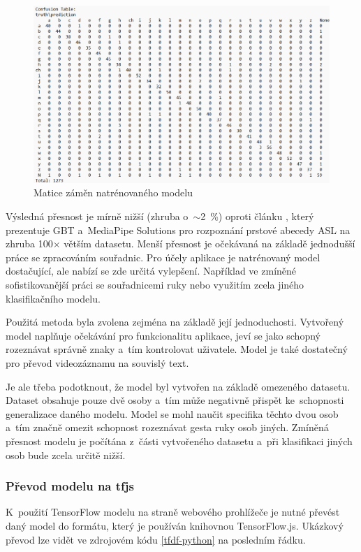 \documentclass[
  master,
  program=ainfvs,
  biblatex,
  figures=true,
  tables=false,
  sourcecodes=true,
  glossaries,
  index
]{kidiplom}
\begin{document}
             \begin{figure}[htbp]
                \centering
                \includegraphics[width=0.9\columnwidth]{graphics/confusion-matrix.png}
                \caption{Matice záměn natrénovaného modelu}
                \label{confusion-matrix}
            \end{figure}
            
            Výsledná přesnost je mírně nižší (zhruba o~\(\sim \)2~\%) oproti článku \cite{benchmark-article}, který prezentuje GBT a~MediaPipe Solutions pro rozpoznání prstové abecedy ASL na zhruba 100\(\times\) větším datasetu. Menší přesnost je očekávaná na základě jednodušší práce se zpracováním souřadnic. Pro účely aplikace je natrénovaný model dostačující, ale nabízí se zde určitá vylepšení. Například ve zmíněné sofistikovanější práci se souřadnicemi ruky nebo využitím zcela jiného klasifikačního modelu. 
            
            Použitá metoda byla zvolena zejména na základě její jednoduchosti. Vytvořený model naplňuje očekávání pro funkcionalitu aplikace, jeví se jako schopný rozeznávat správně znaky a~tím kontrolovat uživatele. Model je také dostatečný pro převod videozáznamu na souvislý text.

            Je ale třeba podotknout, že model byl vytvořen na základě omezeného datasetu. Dataset obsahuje pouze dvě osoby a~tím může negativně přispět ke~schopnosti generalizace daného modelu. Model se mohl naučit specifika těchto dvou osob a~tím značně omezit schopnost rozeznávat gesta ruky osob jiných. Zmíněná přesnost modelu je počítána z~části vytvořeného datasetu a~při klasifikaci jiných osob bude zcela určitě nižší.


        \subsubsection{Převod modelu na tfjs}
            K~použití TensorFlow modelu na straně webového prohlížeče je nutné převést daný model do formátu, který je používán knihovnou TensorFlow.js. Ukázkový převod lze vidět ve zdrojovém kódu \ref{tfdf-python} na posledním řádku.
         
\end{document}
